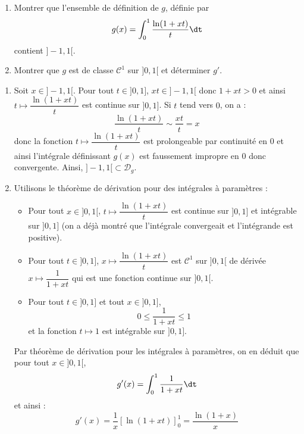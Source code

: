 \documentclass[a4paper,10pt]{report}
\begin{document}
\everymath{\displaystyle}


\begin{center}
\end{center}

\bigskip

\begin{Exa} 
\begin{enumerate}
\item Montrer que l'ensemble de définition de $g$, définie par 
$$ g(x) = \int_{0}^1 \dfrac{\ln(1+xt)}{t} \dt$$
contient $]-1,1[$.
\item Montrer que $g$ est de classe $\mathcal{C}^1$ sur $]0,1[$ et déterminer $g'$.
\end{enumerate}
\end{Exa}

\corr 
\begin{enumerate}
\item Soit $x \in ]-1,1[$. Pour tout $t \in ]0,1]$, $xt \in ]-1,1[$ donc $1+xt >0$ et ainsi $t \mapsto \dfrac{\ln(1+xt)}{t} $ est continue sur $]0,1]$. Si $t$ tend vers $0$, on a :
$$ \dfrac{\ln(1+xt)}{t}  \sim \dfrac{xt}{t}= x$$
donc la fonction $t \mapsto \dfrac{\ln(1+xt)}{t} $ est prolongeable par continuité en $0$ et ainsi l'intégrale définissant $g(x)$ est faussement impropre en $0$ donc convergente. Ainsi, $]-1,1[ \subset \mathcal{D}_g$.

\item Utilisons le théorème de dérivation pour des intégrales à paramètres :
\begin{itemize}
\item Pour tout $x \in ]0,1[$, $t \mapsto \dfrac{\ln(1+xt)}{t}$ est continue sur $]0,1]$ et intégrable sur $]0,1]$ (on a déjà montré que l'intégrale convergeait et l'intégrande est positive).
\item Pour tout $t \in ]0,1]$, $x \mapsto \dfrac{\ln(1+xt)}{t}$ est $\mathcal{C}^1$ sur $]0,1[$ de dérivée $x \mapsto \dfrac{1}{1+xt}$ qui est une fonction continue sur $]0,1[$.
\item Pour tout $t \in ]0,1]$ et tout $x \in ]0,1]$,
$$ 0 \leq \dfrac{1}{1+xt} \leq 1$$
et la fonction $t \mapsto 1$ est intégrable sur $]0,1]$.
\end{itemize}
Par théorème de dérivation pour les intégrales à paramètres, on en déduit que pour tout $x \in ]0,1[$,
$$ g'(x) = \int_{0}^1 \dfrac{1}{1+xt} \dt$$
et ainsi :
$$ g'(x) = \dfrac{1}{x} [ \ln(1+xt) ]_0^1 = \dfrac{\ln(1+x)}{x}$$
\end{enumerate}
\end{document}
